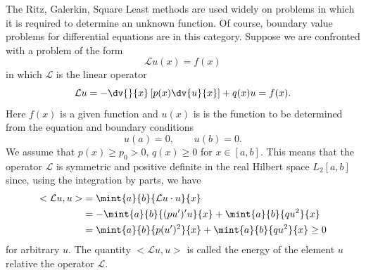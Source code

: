 The Ritz, Galerkin, Square Least methods are used widely on problems
in which it is required to determine an unknown function. Of course,
boundary value problems for differential equations are in this
category. Suppose we are confronted with a problem of the form
%
\begin{equation}
  \mathcal{L} u(x)=f(x)
\end{equation}
%
in which $\mathcal{L}$ is the linear operator
%
\begin{equation}
  \mathcal{L} u=-\dv{}{x} \left[ p(x) \dv{u}{x} \right ] + q(x)u = f(x).
\end{equation}
%
Here $f(x)$ is a given function and $u(x)$ is is the function to be
determined from the equation and boundary conditions
%
\begin{equation}
  u(a)=0, \qquad u(b)=0.
\end{equation}
%
We assume that $p(x)\ge p_0>0$, $q(x)\ge 0$ for $x\in [a,b]$. This
means that the operator $\mathcal{L}$ is symmetric and positive
definite in the real Hilbert space $L_2[a,b]$ since, using the
integration by parts, we have
%
\begin{align*}
  <\mathcal{L}u,u> & = \mint{a}{b}{\mathcal{L} u \cdot u}{x} \\
  & = -\mint{a}{b}{(p u')'u}{x} + \mint{a}{b}{q u^2}{x} \\
  & = \mint{a}{b}{p(u')^2}{x} + \mint{a}{b}{q u^2}{x} \ge 0
\end{align*}
%
for arbitrary $u$. The quantity $<\mathcal{L}u,u>$ is called the
energy of the element $u$ relative the operator $\mathcal{L}$.

